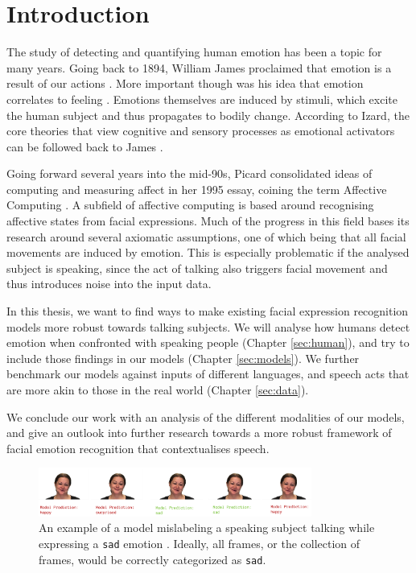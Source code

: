 \section{Introduction}
\label{sec:intro}

The study of detecting and quantifying human emotion has been a topic for many years. Going back to 1894, William James proclaimed that emotion is a result of our actions \cite{james1948emotion}. More important though was his idea that emotion correlates to feeling \cite{james2007principles}. Emotions themselves are induced by stimuli, which excite the human subject and thus propagates to bodily change. According to Izard, the core theories that view cognitive and sensory processes as emotional activators can be followed back to James \cite{izard1990substrates}.

Going forward several years into the mid-90s, Picard consolidated ideas of computing and measuring affect in her 1995 essay, coining the term Affective Computing \cite{picard2000affective}. A subfield of affective computing is based around recognising affective states from facial expressions. Much of the progress in this field bases its research around several axiomatic assumptions, one of which being that all facial movements are induced by emotion. This is especially problematic if the analysed subject is speaking, since the act of talking also triggers facial movement and thus introduces noise into the input data. 

In this thesis, we want to find ways to make existing facial expression recognition models more robust towards talking subjects. We will analyse how humans detect emotion when confronted with speaking people (Chapter \ref{sec:human}), and try to include those findings in our models (Chapter \ref{sec:models}). We further benchmark our models against inputs of different languages, and speech acts that are more akin to those in the real world (Chapter \ref{sec:data}).

We conclude our work with an analysis of the different modalities of our models, and give an outlook into further research towards a more robust framework of facial emotion recognition that contextualises speech.

\begin{figure}
    \centering
    \includegraphics[width=0.8\textwidth]{res/modelex.png}
    \caption{An example of a model mislabeling a speaking subject talking while expressing a \texttt{sad} emotion \cite{livingstone2018ryerson}. Ideally, all frames, or the collection of frames, would be correctly categorized as \texttt{sad}.}
    \label{fig:mislabel}
\end{figure}